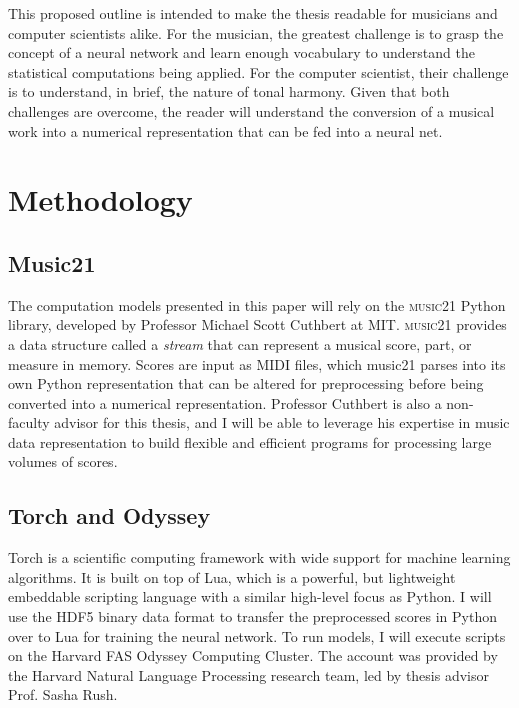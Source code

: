 \documentclass[11pt]{article}
\begin{document}
This proposed outline is intended to make the thesis readable for musicians and computer scientists alike. For the musician, the greatest challenge is to grasp the concept of a neural network and learn enough vocabulary to understand the statistical computations being applied. For the computer scientist, their challenge is to understand, in brief, the nature of tonal harmony. Given that both challenges are overcome, the reader will understand the conversion of a musical work into a numerical representation that can be fed into a neural net.

\section{Methodology}

\subsection{Music21}

The computation models presented in this paper will rely on the \textsc{music21} Python library, developed by Professor Michael Scott Cuthbert at MIT. \textsc{music21} provides a data structure called a \textit{stream} that can represent a musical score, part, or measure in memory. Scores are input as MIDI files, which music21 parses into its own Python representation that can be altered for preprocessing before being converted into a numerical representation. Professor Cuthbert is also a non-faculty advisor for this thesis, and I will be able to leverage his expertise in music data representation to build flexible and efficient programs for processing large volumes of scores.

\subsection{Torch and Odyssey}

Torch is a scientific computing framework with wide support for machine learning algorithms. It is built on top of Lua, which is a powerful, but lightweight embeddable scripting language with a similar high-level focus as Python. I will use the HDF5 binary data format to transfer the preprocessed scores in Python over to Lua for training the neural network. To run models, I will execute scripts on the Harvard FAS Odyssey Computing Cluster. The account was provided by the Harvard Natural Language Processing research team, led by thesis advisor Prof. Sasha Rush.
\end{document}
